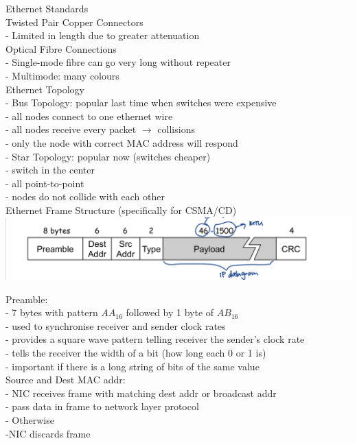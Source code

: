 \documentclass[10pt, a4paper]{article}
\newcommand{\red}[1]{{\color{red}#1}}
\newcommand{\green}[1]{{\color{ForestGreen}#1}}
\newcommand{\tab}[0]{\hspace*{2mm}}
\begin{document}
\begin{multicols*}{3}
		Ethernet Standards\\
		Twisted Pair Copper Connectors\\
		- Limited in length due to greater attenuation\\
		Optical Fibre Connections\\
		- Single-mode fibre can go very long without repeater\\
		- Multimode: many colours\\

		Ethernet Topology\\
		- Bus Topology: popular last time when switches were expensive\\
		\tab - all nodes connect to one ethernet wire\\
		\tab - all nodes receive every packet $\rightarrow$ collisions\\
		\tab - only the node with correct MAC address will respond\\
		- Star Topology: popular now (switches cheaper)\\
		\tab - switch in the center\\
		\tab - all point-to-point\\
		\tab - nodes do not collide with each other\\

		Ethernet Frame Structure (specifically for CSMA/CD)\\
		\includegraphics[scale=.16]{./assets/ethernetFrame}

		Preamble:\\
		- 7 bytes with pattern $AA_{16}$ followed by 1 byte of $AB_{16}$\\
		- used to synchronise receiver and sender clock rates\\
		- provides a square wave pattern telling receiver the sender's clock rate\\
		- tells the receiver the width of a bit (how long each 0 or 1 is)\\
		- important if there is a long string of bits of the same value\\

		Source and Dest MAC addr:\\
		- NIC receives frame with \green{matching dest addr or broadcast addr}\\
		\tab - pass data in frame to network layer protocol\\
		- \red{Otherwise}\\
		\tab -NIC discards frame\\


\end{multicols*}
\end{document}
